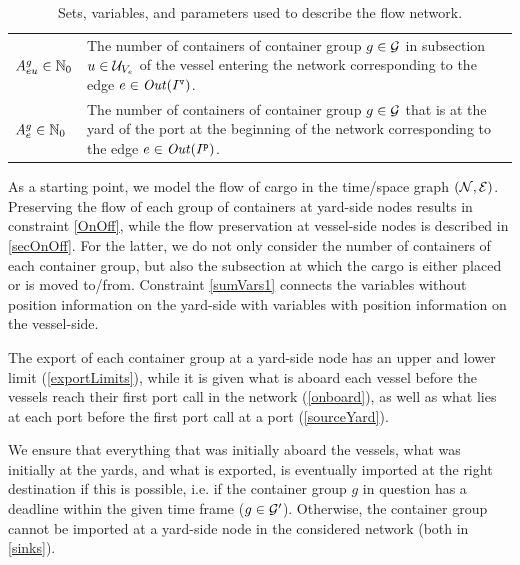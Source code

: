\begin{table}[htbp]
\begin{tabular}{p{4cm}p{10.5cm}}
$A^{g}_{eu}\in \mathbb{N}_0$			& The number of containers of container group $g\in\mathcal{G}$ in subsection $u\in \mathcal{U}_{V_e}$ of the vessel entering the network corresponding to the edge $e\in\mathit{Out}(I^\texttt{v})$.\\
$A^g_e\in \mathbb{N}_0$						& The number of containers of container group $g\in \mathcal{G}$ that is at the yard of the port at the beginning of the network corresponding to the edge $e\in\mathit{Out}(I^\texttt{p})$.\\
\end{tabular}
\caption{Sets, variables, and parameters used to describe the flow network.}\label{tab:net}
\end{table}

As a starting point, we model the flow of cargo in the time/space graph $(\mathcal{N},\mathcal{E})$. Preserving the flow of each group of containers at yard-side nodes results in constraint \eqref{OnOff}, while the flow preservation at vessel-side nodes is described in \eqref{secOnOff}. 
For the latter, we do not only consider the number of containers of each container group, but also the subsection at which the cargo is either placed or is moved to/from. Constraint \eqref{sumVars1} connects the variables without position information on the yard-side with variables with position information on the vessel-side. 

The export of each container group at a yard-side node has an upper and lower limit (\ref{exportLimits}), while it is given what is aboard each vessel before the vessels reach their first port call in the network (\ref{onboard}), as well as what lies at each port before the first port call at a port (\ref{sourceYard}).

We ensure that everything that was initially aboard the vessels, what was initially at the yards, and what is exported, is eventually imported at the right destination if this is possible, i.e. if the container group $g$ in question has a deadline within the given time frame ($g\in\mathcal{G}'$). Otherwise, the container group cannot be imported at a yard-side node in the considered network (both in \eqref{sinks}).  

